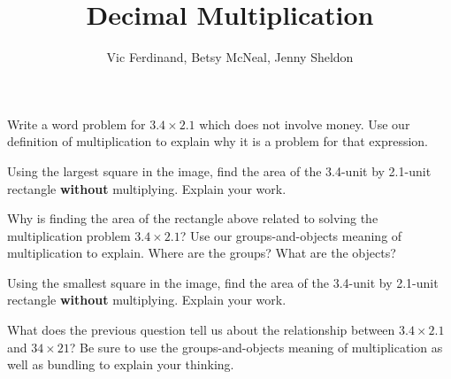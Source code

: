 \documentclass{ximera}
\title{Decimal Multiplication}
\author{Vic Ferdinand, Betsy McNeal, Jenny Sheldon}
\begin{document}
\begin{abstract}  \end{abstract}
\maketitle


\begin{problem}
Write a word problem for $3.4 \times 2.1$ which does not involve money. Use our definition of multiplication to explain why it is a problem for that expression.
\end{problem}

\begin{problem}
Using the largest square in the image, find the area of the 3.4-unit by 2.1-unit rectangle {\bf without} multiplying. Explain your work.

\begin{image}
\end{image}
\end{problem}

\begin{problem}
Why is finding the area of the rectangle above related to solving the multiplication problem $3.4 \times 2.1$? Use our groups-and-objects meaning of multiplication to explain. Where are the groups? What are the objects?
\end{problem}

\newpage

\begin{problem}
Using the smallest square in the image, find the area of the 3.4-unit by 2.1-unit rectangle {\bf without} multiplying. Explain your work.

\begin{image}
\end{image}
\end{problem}

\begin{problem}
What does the previous question tell us about the relationship between $3.4 \times 2.1$ and $34 \times 21$? Be sure to use the groups-and-objects meaning of multiplication as well as bundling to explain your thinking.
\end{problem}
\end{document}
